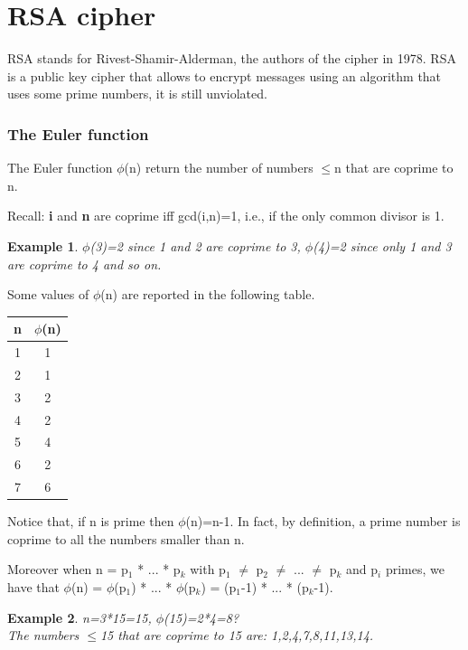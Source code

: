 \documentclass[a4paper, 12pt]{report}
\newtheorem{example}{\textbf{Example}}
\begin{document}
\section*{RSA cipher}
RSA stands for Rivest-Shamir-Alderman, the authors of the cipher in 1978. RSA is a public key cipher that allows to encrypt messages using an algorithm that uses some prime numbers, it is still unviolated.

\subsubsection{The Euler function}
The Euler function $\phi$(n) return the number of numbers $\le$n that are coprime to n.

Recall: \textbf{i} and \textbf{n} are coprime iff gcd(i,n)=1, i.e., if the only common divisor is 1.

\begin{example}
	$\phi$(3)=2 since 1 and 2 are coprime to 3, $\phi$(4)=2 since only 1 and 3 are coprime to 4 and so on.
\end{example}

Some values of $\phi$(n) are reported in the following table.
\begin{table}[H]
	\centering
	\begin{tabular}{|c|c|}
		\hline
		\textbf{n} & \textbf{$\phi$(n)} \\ \hline
		1 & 1\\
		2 & 1\\
		3 & 2\\
		4 & 2\\
		5 & 4\\
		6 & 2\\
		7 & 6\\ \hline
	\end{tabular}
\end{table}

Notice that, if n is prime then $\phi$(n)=n-1. In fact, by definition, a prime number is coprime to all the numbers smaller than n.

Moreover when n = p$_1$ * ... * p$_k$ with p$_1$ $\ne$ p$_2$ $\ne$ ... $\ne$ p$_k$ and p$_i$ primes, we have that $\phi$(n) = $\phi$(p$_1$) * ... * $\phi$(p$_k$) = (p$_1$-1) * ... * (p$_k$-1).

\begin{example}
	n=3*15=15, $\phi$(15)=2*4=8?\\
	The numbers $\le$15 that are coprime to 15 are: 1,2,4,7,8,11,13,14.
\end{example}
\end{document}
